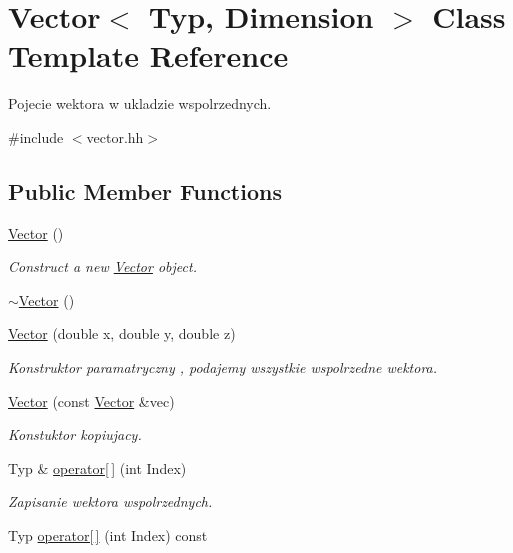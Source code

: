 \hypertarget{class_vector}{}\section{Vector$<$ Typ, Dimension $>$ Class Template Reference}
\label{class_vector}


Pojecie wektora w ukladzie wspolrzednych.  




{\ttfamily \#include $<$vector.\+hh$>$}

\subsection*{Public Member Functions}
\begin{DoxyCompactItemize}
\item 
\hyperlink{class_vector_a0dff28c6575a4239e55d76c62e12f9c8}{Vector} ()
\begin{DoxyCompactList}\small\item\em Construct a new \hyperlink{class_vector}{Vector} object. \end{DoxyCompactList}\item 
\hyperlink{class_vector_a474267f5ebbaf240b6e01e9f9a4008dc}{$\sim$\+Vector} ()
\item 
\hyperlink{class_vector_ac9bd98e42e721a38a9f92e6de1ac91ac}{Vector} (double x, double y, double z)
\begin{DoxyCompactList}\small\item\em Konstruktor paramatryczny , podajemy wszystkie wspolrzedne wektora. \end{DoxyCompactList}\item 
\hyperlink{class_vector_a839c68689534954133753f8bcc6f953d}{Vector} (const \hyperlink{class_vector}{Vector} \&vec)
\begin{DoxyCompactList}\small\item\em Konstuktor kopiujacy. \end{DoxyCompactList}\item 
Typ \& \hyperlink{class_vector_acfb4ddcc2287a4fcf158f559907ba378}{operator\mbox{[}$\,$\mbox{]}} (int Index)
\begin{DoxyCompactList}\small\item\em Zapisanie wektora wspolrzednych. \end{DoxyCompactList}\item 
Typ \hyperlink{class_vector_a0657574140fa760b6c624a284f7ba2b7}{operator\mbox{[}$\,$\mbox{]}} (int Index) const 

\end{DoxyCompactItemize}
